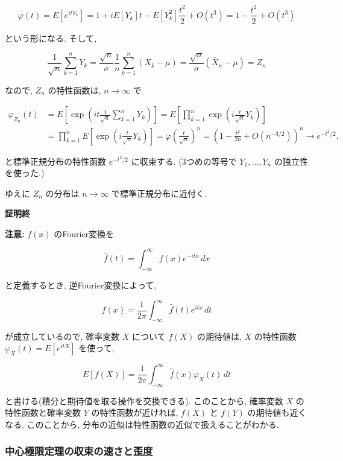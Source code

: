 \documentclass[10pt, a4paper,xelatex,ja=standard]{bxjsarticle}
\begin{document}
\[
\varphi(t) =
E[e^{itY_k}] =
1 + iE[Y_k]t - E[Y_k^2]\frac{t^2}{2} + O(t^3) =
1 - \frac{t^2}{2} + O(t^3)
\]

という形になる. そして,

\[
\frac{1}{\sqrt{n}}\sum_{k=1}^n Y_k =
\frac{\sqrt{n}}{\sigma}\frac{1}{n}\sum_{k=1}^n (X_k - \mu) =
\frac{\sqrt{n}}{\sigma}(\bar{X}_n - \mu) = Z_n
\]

なので, \(Z_n\) の特性函数は, \(n\to\infty\) で

\[
\begin{aligned}
\varphi_{Z_n}(t) &=
E\left[\exp\left(it \frac{1}{\sqrt{n}}\sum_{k=1}^n Y_k\right)\right] =
E\left[\prod_{k=1}^n\exp\left(i\frac{t}{\sqrt{n}}Y_k\right)\right]
\\ &=
\prod_{k=1}^n E\left[\exp\left(i\frac{t}{\sqrt{n}}Y_k\right)\right] =
\varphi\left(\frac{t}{\sqrt{n}}\right)^n =
\left(1 - \frac{t^2}{2n} + O(n^{-3/2})\right)^n \to
e^{-t^2/2}.
\end{aligned}
\]

と標準正規分布の特性函数 \(e^{-t^2/2}\) に収束する. (3つめの等号で
\(Y_1,\ldots,Y_n\) の独立性を使った.)

ゆえに \(Z_n\) の分布は \(n\to\infty\) で標準正規分布に近付く.

\textbf{証明終}

\textbf{注意:} \(f(x)\) のFourier変換を

\[
\hat{f}(t) = \int_{-\infty}^\infty f(x) e^{-itx}\,dx
\]

と定義するとき, 逆Fourier変換によって,

\[
f(x) = \frac{1}{2\pi} \int_{-\infty}^\infty \hat{f}(t) e^{itx}\,dt
\]

が成立しているので, 確率変数 \(X\) について \(f(X)\) の期待値は, \(X\)
の特性函数 \(\varphi_X(t) = E[e^{itX}]\) を使って,

\[
E[f(X)] = \frac{1}{2\pi} \int_{-\infty}^\infty \hat{f}(x) \varphi_X(t) \,dt
\]

と書ける(積分と期待値を取る操作を交換できる). このことから, 確率変数
\(X\) の特性函数と確率変数 \(Y\) の特性函数が近ければ, \(f(X)\) と
\(f(Y)\) の期待値も近くなる. このことから,
分布の近似は特性函数の近似で扱えることがわかる.

    \hypertarget{ux4e2dux5fc3ux6975ux9650ux5b9aux7406ux306eux53ceux675fux306eux901fux3055ux3068ux6b6aux5ea6}{%
\subsubsection{中心極限定理の収束の速さと歪度}\label{ux4e2dux5fc3ux6975ux9650ux5b9aux7406ux306eux53ceux675fux306eux901fux3055ux3068ux6b6aux5ea6}}
\end{document}
